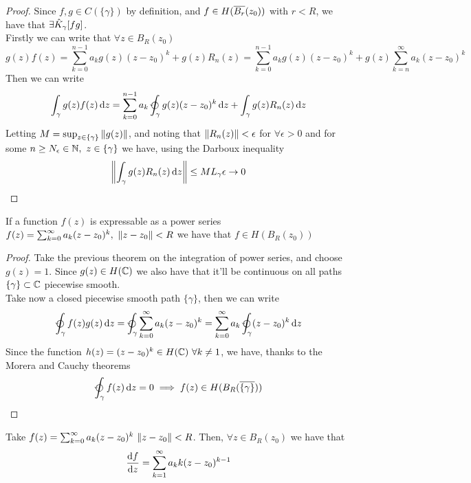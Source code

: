\documentclass[../complete.tex]{subfiles}
\begin{document}
\begin{proof}
	Since $f,g\in C(\{\gamma\})$ by definition, and $f\in H(\overline{B_r}(z_0))$ with $r<R$, we have that $\exists\hat{K}_\gamma[fg]$.\\
	Firstly we can write that $\forall z\in B_R(z_0)$
	\begin{equation*}
		g(z)f(z)=\sum_{k=0}^{n-1}a_kg(z)(z-z_0)^k+g(z)R_n(z)=\sum_{k=0}^{n-1}a_kg(z)(z-z_0)^k+g(z)\sum_{k=n}^\infty a_k(z-z_0)^k
	\end{equation*}
	Then we can write
	\begin{equation*}
		\int_{\gamma}^{}g(z)f(z)\diff z=\sum_{k=0}^{n-1}a_k\ointccw_\gamma g(z)(z-z_0)^k\diff z+\int_{\gamma}^{}g(z)R_n(z)\diff z
	\end{equation*}
	Letting $M=\sup_{z\in\{\gamma\}}\norm{g(z)}$, and noting that $\norm{R_n(z)}<\epsilon$ for $\forall\epsilon>0$ and for some $n\ge N_\epsilon\in\N,\ z\in\{\gamma\}$ we have, using the Darboux inequality
	\begin{equation*}
		\norm{\int_{\gamma}^{}g(z)R_n(z)\operatorname{d\!} z}\le ML_\gamma\epsilon\to0
	\end{equation*}
\end{proof}
\begin{thm}
	If a function $f(z)$ is expressable as a power series $f(z)=\sum_{k=0}^\infty a_k(z-z_0)^k,\ \norm{z-z_0}<R$ we have that $f\in H(B_R(z_0))$
\end{thm}
\begin{proof}
	Take the previous theorem on the integration of power series, and choose $g(z)=1$. Since $g(z)\in H(\mathbb{C})$ we also have that it'll be continuous on all paths $\{\gamma\}\subset\mathbb{C}$ piecewise smooth.\\
	Take now a closed piecewise smooth path $\{\gamma\}$, then we can write
	\begin{equation*}
		\ointccw_\gamma f(z)g(z)\diff z=\ointccw_\gamma\sum_{k=0}^\infty a_k(z-z_0)^k=\sum_{k=0}^\infty a_k\ointccw_\gamma(z-z_0)^k\diff z
	\end{equation*}
	Since the function $h(z)=(z-z_0)^k\in H(\mathbb{C})\ \forall k\ne1$, we have, thanks to the Morera and Cauchy theorems
	\begin{equation*}
		\ointccw_\gamma f(z)\diff z=0\implies{} f(z)\in H(B_R(\cc{\{\gamma\}}))
	\end{equation*}
\end{proof}
\begin{cor}
	Take $f(z)=\sum_{k=0}^\infty a_k(z-z_0)^k\ \norm{z-z_0}<R$. Then, $\forall z\in B_R(z_0)$ we have that
	\begin{equation}
		\derivative{f}{z}=\sum_{k=1}^\infty a_kk(z-z_0)^{k-1}
		\label{eq:derivativeps2}
	\end{equation}
\end{cor}
\end{document}
